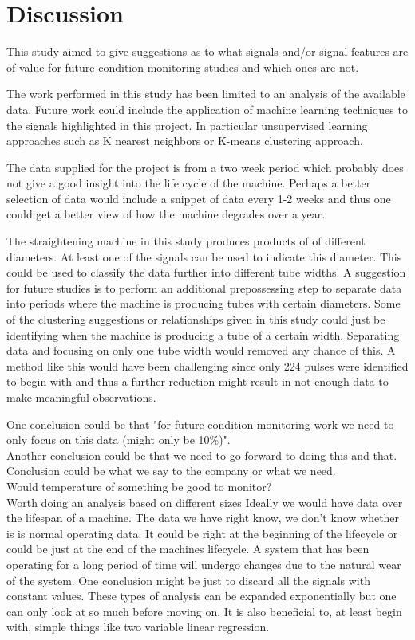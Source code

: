 \documentclass{article}
\begin{document}
\clearpage 

\section{Discussion}
This study aimed to give suggestions as to what signals and/or signal features are of value for future condition monitoring studies and which ones are not.

The work performed in this study has been limited to an analysis of the available data. Future work could include the application of machine learning techniques to the signals highlighted in this project. In particular unsupervised learning approaches such as K nearest neighbors or K-means clustering approach.

The data supplied for the project is from a two week period which probably does not give a good insight into the life cycle of the machine. Perhaps a better selection of data would include a snippet of data every 1-2 weeks and thus one could get a better view of how the machine degrades over a year.

The straightening machine in this study produces products of of different diameters. At least one of the signals can be used to indicate this diameter. This could be used to classify the data further into different tube widths. A suggestion for future studies is to perform an additional prepossessing step to separate data into periods where the machine is producing tubes with certain diameters. Some of the clustering suggestions or relationships given in this study could just be identifying when the machine is producing a tube of a certain width. Separating data and focusing on only one tube width would removed any chance of this. A method like this would have been challenging since only 224 pulses were identified to begin with and thus a further reduction might result in not enough data to make meaningful observations.

One conclusion could be that "for future condition monitoring work we need to only focus on this data (might only be 10\%)".\\
Another conclusion could be that we need to go forward to doing this and that.\\
Conclusion could be what we say to the company or what we need.\\
Would temperature of something be good to monitor?\\
Worth doing an analysis based on different sizes
Ideally we would have data over the lifespan of a machine. The data we have right know, we don't know whether is is normal operating data. It could be right at the beginning of the lifecycle or could be just at the end of the machines lifecycle. A system that has been operating for a long period of time will undergo changes due to the natural wear of the system.
One conclusion might be just to discard all the signals with constant values.
These types of analysis can be expanded exponentially but one can only look at so much before moving on. It is also beneficial to, at least begin with, simple things like two variable linear regression.
\end{document}

